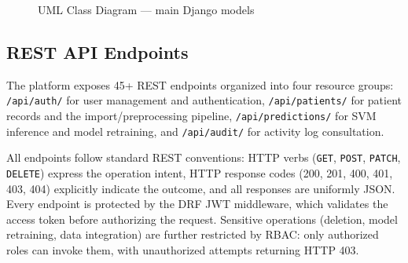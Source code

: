 \documentclass[12pt,a4paper,twoside]{report}
\begin{document}
\begin{figure}[htbp]
{%
}
\caption{UML Class Diagram --- main Django models}
\label{fig:class_diagram}
\end{figure}

\subsection{REST API Endpoints}

The platform exposes 45+ REST endpoints organized into four resource groups: \texttt{/api/auth/} for user management and authentication, \texttt{/api/patients/} for patient records and the import/preprocessing pipeline, \texttt{/api/predictions/} for SVM inference and model retraining, and \texttt{/api/audit/} for activity log consultation.

All endpoints follow standard REST conventions: HTTP verbs (\texttt{GET}, \texttt{POST}, \texttt{PATCH}, \texttt{DELETE}) express the operation intent, HTTP response codes (200, 201, 400, 401, 403, 404) explicitly indicate the outcome, and all responses are uniformly JSON. Every endpoint is protected by the DRF JWT middleware, which validates the access token before authorizing the request. Sensitive operations (deletion, model retraining, data integration) are further restricted by RBAC: only authorized roles can invoke them, with unauthorized attempts returning HTTP 403.
\end{document}
